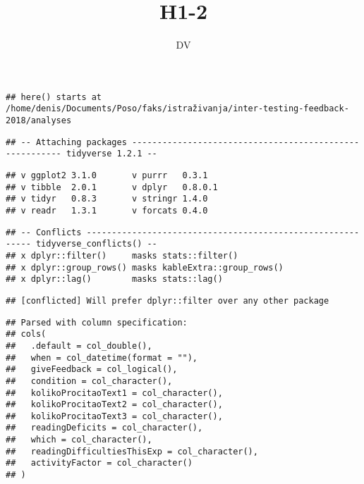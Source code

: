 \documentclass[12pt,]{article}
\title{H1-2}
\author{DV}
\date{}
\newenvironment{Shaded}{\begin{snugshade}}{\end{snugshade}}
\newcommand{\DataTypeTok}[1]{\textcolor[rgb]{0.13,0.29,0.53}{#1}}
\newcommand{\DecValTok}[1]{\textcolor[rgb]{0.00,0.00,0.81}{#1}}
\newcommand{\KeywordTok}[1]{\textcolor[rgb]{0.13,0.29,0.53}{\textbf{#1}}}
\newcommand{\NormalTok}[1]{#1}
\newcommand{\OperatorTok}[1]{\textcolor[rgb]{0.81,0.36,0.00}{\textbf{#1}}}
\newcommand{\StringTok}[1]{\textcolor[rgb]{0.31,0.60,0.02}{#1}}
\begin{document}
\maketitle

{
\setcounter{tocdepth}{4}
\tableofcontents
}
\begin{Shaded}
\end{Shaded}

\begin{verbatim}
## here() starts at /home/denis/Documents/Poso/faks/istraživanja/inter-testing-feedback-2018/analyses
\end{verbatim}

\begin{verbatim}
## -- Attaching packages -------------------------------------------------------- tidyverse 1.2.1 --
\end{verbatim}

\begin{verbatim}
## v ggplot2 3.1.0       v purrr   0.3.1  
## v tibble  2.0.1       v dplyr   0.8.0.1
## v tidyr   0.8.3       v stringr 1.4.0  
## v readr   1.3.1       v forcats 0.4.0
\end{verbatim}

\begin{verbatim}
## -- Conflicts ----------------------------------------------------------- tidyverse_conflicts() --
## x dplyr::filter()     masks stats::filter()
## x dplyr::group_rows() masks kableExtra::group_rows()
## x dplyr::lag()        masks stats::lag()
\end{verbatim}

\begin{verbatim}
## [conflicted] Will prefer dplyr::filter over any other package
\end{verbatim}

\begin{verbatim}
## Parsed with column specification:
## cols(
##   .default = col_double(),
##   when = col_datetime(format = ""),
##   giveFeedback = col_logical(),
##   condition = col_character(),
##   kolikoProcitaoText1 = col_character(),
##   kolikoProcitaoText2 = col_character(),
##   kolikoProcitaoText3 = col_character(),
##   readingDeficits = col_character(),
##   which = col_character(),
##   readingDifficultiesThisExp = col_character(),
##   activityFactor = col_character()
## )
\end{verbatim}
\end{document}
